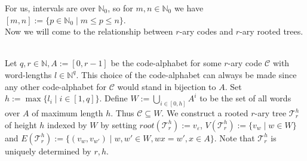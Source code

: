 \documentclass[12pt]{article}
\newcommand{\T}[0]{{\mathcal{T}_r^h}}
\newcommand{\ro}[0]{\textit{root}}
\newenvironment{statement3}[3]{\begin{trivlist}
\item[\hskip \labelsep {\bfseries #1}\hskip \labelsep {\bfseries #2} {#3}\textbf{.}]}{\end{trivlist}}
\begin{document}
For us, intervals are over $\mathbb{N}_0$, so for $m,n \in \mathbb{N}_0$ we have $[m,n] := \{p \in \mathbb{N}_0 \mid
m \leq p \leq n\}$.\\
Now we will come to the relationship between $r$-ary codes and $r$-ary rooted trees.

\begin{statement3}{(1.4)}{Definition}{(r-ary Trees from r-ary Codes)}\strut\\[2pt]
    Let $q,r \in \mathbb{N}, A := [0,r-1]$ be the code-alphabet for some $r$-ary code $\mathcal{C}$ with word-lengths
    $l \in \mathbb{N}^q$. This choice of the code-alphabet can always be made since any other code-alphabet
    for $\mathcal{C}$ would stand in bijection to $A$.
    Set $h := \max\{l_i \mid i \in [1,q]\}$.
    Define $W := \bigcup_{i \in [0,h]} A^i$ to be the set of all words over $A$ of maximum length $h$. Thus
    $\mathcal{C} \subseteq W$. We construct a rooted $r$-ary tree $\T$ of height $h$ indexed by $W$ by setting
    $\ro(\T) := v_\varepsilon$, $V(\T) := \{v_w \mid w \in W\}$ and
    $E(\T) := \{(v_w,v_{w'}) \mid w,w' \in W, wx = w', x\in A\}$. Note that $\T$ is uniquely determined by $r,h$.
\end{statement3}
\end{document}

